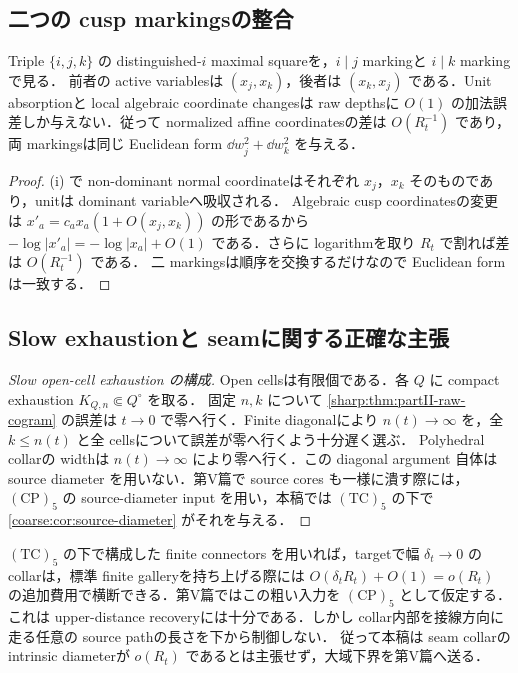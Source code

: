 \documentclass[a4paper,11pt]{ltjsarticle}
\numberwithin{equation}{section}
\theoremstyle{plain}
\theoremstyle{definition}
\theoremstyle{remark}
\begin{document}
\subsection{二つの cusp markingsの整合}

\begin{proposition}\label{sharp:prop:triple-marking-audit}
Triple $\{i,j,k\}$ の distinguished-$i$ maximal squareを，$i\mid j$ markingと $i\mid k$ markingで見る．
前者の active variablesは $(x_j,x_k)$，後者は $(x_k,x_j)$ である．Unit absorptionと local algebraic coordinate changesは
raw depthsに $O(1)$ の加法誤差しか与えない．従って normalized affine coordinatesの差は $O(R_t^{-1})$ であり，
両 markingsは同じ Euclidean form $\dd w_j^2+\dd w_k^2$ を与える．
\end{proposition}

\begin{proof}
(i) で non-dominant normal coordinateはそれぞれ $x_j$，$x_k$ そのものであり，unitは dominant variableへ吸収される．
Algebraic cusp coordinatesの変更は $x'_a=c_ax_a(1+O(x_j,x_k))$ の形であるから
$-\log|x'_a|=-\log|x_a|+O(1)$ である．さらに logarithmを取り $R_t$ で割れば差は $O(R_t^{-1})$ である．
二 markingsは順序を交換するだけなので Euclidean formは一致する．
\end{proof}

\subsection{Slow exhaustionと seamに関する正確な主張}

\begin{proof}[Slow open-cell exhaustion の構成]
Open cellsは有限個である．各 $Q$ に compact exhaustion $K_{Q,n}\Subset Q^\circ$ を取る．
固定 $n,k$ について \cref{sharp:thm:partII-raw-cogram} の誤差は $t\to0$ で零へ行く．Finite diagonalにより
$n(t)\to\infty$ を，全 $k\le n(t)$ と全 cellsについて誤差が零へ行くよう十分遅く選ぶ．
Polyhedral collarの widthは $n(t)\to\infty$ により零へ行く．この diagonal argument 自体は source diameter を用いない．第V篇で source cores も一様に潰す際には，$\mathrm{(CP)}_5$ の source-diameter input を用い，本稿では $\mathrm{(TC)}_5$ の下で \cref{coarse:cor:source-diameter} がそれを与える．
\end{proof}

\begin{remark}\label{sharp:rem:no-shortcut-warning}
$\mathrm{(TC)}_5$ の下で構成した finite connectors を用いれば，targetで幅 $\delta_t\to0$ の collarは，標準 finite galleryを持ち上げる際には $O(\delta_tR_t)+O(1)=o(R_t)$ の追加費用で横断できる．第V篇ではこの粗い入力を $\mathrm{(CP)}_5$ として仮定する．
これは upper-distance recoveryには十分である．しかし collar内部を接線方向に走る任意の source pathの長さを下から制御しない．
従って本稿は seam collarの intrinsic diameterが $o(R_t)$ であるとは主張せず，大域下界を第V篇へ送る．
\end{remark}
\end{document}
